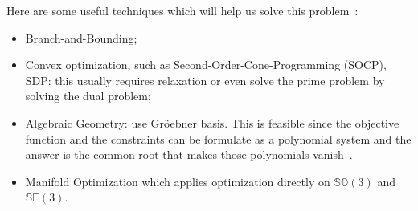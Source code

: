 \documentclass[a4paper]{report}
\begin{document}
Here are some useful techniques which will help us solve this problem~\cite{hartley2007optimal}:
\begin{itemize}
\item Branch-and-Bounding;
\item Convex optimization, such as Second-Order-Cone-Programming (SOCP), SDP: this usually requires relaxation or even solve the prime problem by solving the dual problem;
\item Algebraic Geometry: use Gr\"{o}ebner basis. This is feasible since the objective function and the constraints can be formulate as a polynomial system and the answer is the common root that makes those polynomials vanish~\cite{kukelova2008automatic}. 
\item Manifold Optimization which applies optimization directly on $\mathbb{SO}(3)$ and $\mathbb{SE}(3)$.
\end{itemize}
\end{document}
